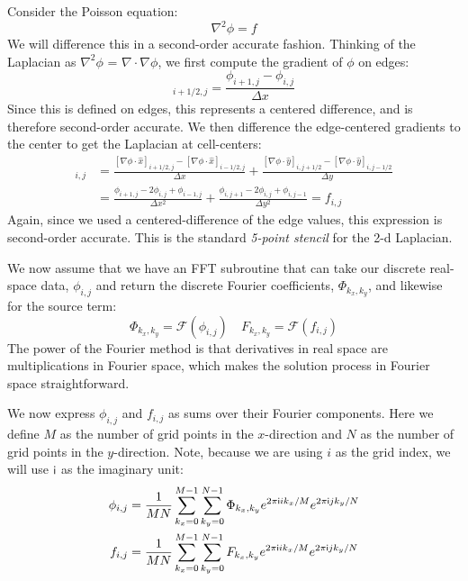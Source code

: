 Consider the Poisson equation:
\begin{equation}
\nabla^2 \phi = f
\end{equation}
We will difference this in a second-order accurate fashion.  Thinking
of the Laplacian as $\nabla^2 \phi$ = $\nabla \cdot \nabla \phi$, we
first compute the gradient of $\phi$ on edges:
\begin{equation}
[\nabla \phi \cdot \hat{x}]_{i+1/2,j} = \frac{\phi_{i+1,j} - \phi_{i,j}}{\Delta x}
\end{equation}
Since this is defined on edges, this represents a centered difference, and is
therefore second-order accurate.  We then difference the edge-centered
gradients to the center to get the Laplacian at cell-centers:
\begin{align}
[\nabla^2 \phi]_{i,j} &=
   \frac{[\nabla \phi \cdot \hat{x}]_{i+1/2,j} -
         [\nabla \phi \cdot \hat{x}]_{i-1/2,j}}{\Delta x} +
   \frac{[\nabla \phi \cdot \hat{y}]_{i,j+1/2} -
         [\nabla \phi \cdot \hat{y}]_{i,j-1/2}}{\Delta y} \nonumber\\
%
  &= \frac{\phi_{i+1,j} - 2\phi_{i,j} + \phi_{i-1,j}}{\Delta x^2} +
     \frac{\phi_{i,j+1} - 2\phi_{i,j} + \phi_{i,j-1}}{\Delta y^2} = f_{i,j}
\end{align}        
Again, since we used a centered-difference of the edge values, this
expression is second-order accurate.  This is the standard
{\em 5-point stencil} for the 2-d Laplacian.

We now assume that we have an FFT subroutine that can take our
discrete real-space data, $\phi_{i,j}$ and return the discrete
Fourier coefficients, $\Phi_{k_x,k_y}$, and likewise for the source
term:
\begin{equation}
\Phi_{k_x,k_y} = \mathcal{F}(\phi_{i,j}) \quad
F_{k_x,k_y} = \mathcal{F}(f_{i,j})
\end{equation}
The power of the Fourier method is that derivatives in real space are
multiplications in Fourier space, which makes the solution process in
Fourier space straightforward.

We now express $\phi_{i,j}$ and $f_{i,j}$ as sums over their Fourier
components.  Here we define $M$ as the number of grid points in the
$x$-direction and $N$ as the number of grid points in the
$y$-direction.  Note, because we are using $i$ as the grid index, we
will use $\mathsf{i}$ as the imaginary unit:
\begin{align}
\phi_{i,j} &= \frac{1}{MN} \sum_{k_x = 0}^{M-1} \sum_{k_y = 0}^{N-1}
  \Phi_{k_x,k_y} e^{2\pi\mathsf{i} i k_x/M} e^{2\pi\mathsf{i} j k_y/N} \\
f_{i,j} &= \frac{1}{MN} \sum_{k_x = 0}^{M-1} \sum_{k_y = 0}^{N-1}
  F_{k_x,k_y} e^{2\pi\mathsf{i} i k_x/M} e^{2\pi\mathsf{i} j k_y/N} 
\end{align}

